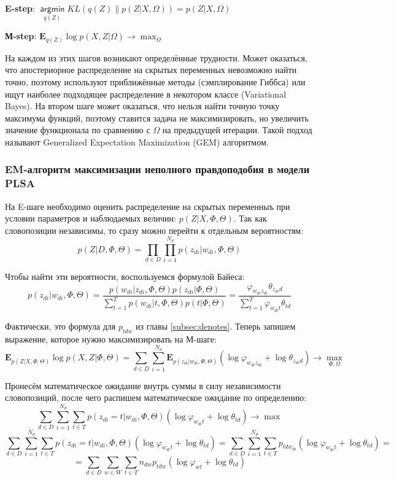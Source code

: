 \documentclass[12pt]{article}
\renewcommand{\phi}{\varphi}
\newcommand{\argmin}{\mathop{\mathsf{argmin}}\limits}
\begin{document}
\textbf{E-step}: $\argmin_{q(Z)} KL(q(Z)\|p(Z|X,\Omega)) = p(Z|X, \Omega)$

\textbf{М-step}: $\mathbf{E}_{q(Z)} \log p(X, Z|\Omega) \to \max_{\Omega}$

На каждом из этих шагов возникают определённые трудности.  Может оказаться, что апостериорное распределение на скрытых переменных невозможно найти точно, поэтому используют приближённые методы (сэмплирование Гиббса) или ищут наиболее подходящее распределение в некотором классе (Variational Bayes). На втором шаге может оказаться, что нельзя найти точную точку максимума функций, поэтому ставится задача не максимизировать, но увеличить значение функционала по сравнению с $\Omega$ на предыдущей итерации. Такой подход называют Generalized Expectation Maximization (GEM) алгоритмом.

\subsubsection{EM-алгоритм максимизации неполного правдоподобия в модели PLSA}

 На E-шаге необходимо оценить распределение на скрытых переменныъ при условии параметров и  наблюдаемых величин: $p(Z|X,\Phi,\Theta)$. Так как словопозиции независимы, то сразу можно перейти к отдельным вероятностям:
\[
p(Z|D,\Phi, \Theta) = \prod\limits_{d \in D} \prod\limits_{i=1}^{N_d} p(z_{di}|w_{di}, \Phi, \Theta)
\]

Чтобы найти эти вероятности, воспользуемся формулой Байеса:
\[
p(z_{di}|w_{di}, \Phi, \Theta) = \frac{p(w_{di}|z_{di}, \Phi, \Theta)p(z_{di}|\Phi,\Theta)}{\sum_{t=1}^T p(w_{di}|t, \Phi, \Theta)p(t|\Phi,\Theta)}
= \frac{\phi_{w_{di} z_{di}} \theta_{z_{di} d}}{\sum_{t=1}^T \phi_{w_{di}t} \theta_{td}}
\]

Фактически, это формула для $p_{tdw}$ из главы \ref{subsec:denotes}. Теперь запишем выражение, которое нужно максимизировать на М-шаге:
\[
\mathbf{E}_{p(Z|X,\Phi, \Theta)} \log p(X,Z|\Phi,\Theta) = \sum_{d \in D} \sum_{i=1}^{N_d} \mathbf{E}_{p(z_{di}|w_{di}, \Phi, \Theta)} (\log \phi_{w_{di} z_{di}} + \log \theta_{z_{di} d}) \to \max\limits_{\Phi, \Omega}
\]

Пронесём математическое ожидание внутрь суммы в силу независимости словопозиций, после чего распишем математическое ожидание по определению:
\[
\sum_{d\in D}\sum_{i=1}^{N_d} \sum_{t \in T} p(z_{di}=t|w_{di},\Phi,\Theta) (\log \phi_{w_{di} t} + \log \theta_{td}) \to \max
\]
\[
\sum_{d\in D}\sum_{i=1}^{N_d} \sum_{t \in T} p(z_{di}=t|w_{di},\Phi,\Theta) (\log \phi_{w_{di} t} + \log \theta_{td}) =
\sum_{d\in D}\sum_{i=1}^{N_d} \sum_{t \in T} p_{tdw_{di}} (\log \phi_{w_{di} t} + \log \theta_{td}) =
\]
\[
=
\sum_{d\in D}\sum_{w \in W} \sum_{t \in T} n_{dw} p_{tdw} (\log \phi_{wt} + \log \theta_{td}) 
\]
\end{document}
